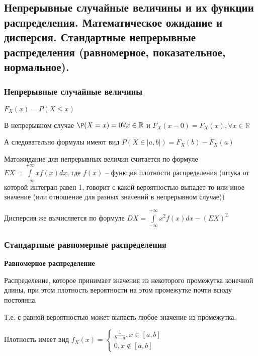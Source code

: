 \subsection{Непрерывные случайные величины и их функции распределения. Математическое ожидание и дисперсия. Стандартные непрерывные распределения (равномерное, показательное, нормальное).}

\subsubsection{Непрерывные случайные величины}


$F_X(x) = P(X \le x)$


В непрерывном случае $\P(X = x) = 0 \forall x \in \mathbb{R}$
и $F_X(x - 0) = F_X(x), \forall x \in \mathbb{R}$

А следовательно формулы имеют вид $P(X \in |a, b|) = F_X(b) - F_X(a)$



Матожидание для непрерывных величин считается по формуле $EX = \int\limits_{-\infty}^{+\infty}xf(x)dx$, где $f(x)$ -- функция плотности распределения (штука от которой интеграл равен 1, говорит с какой вероятностью выпадет то или иное значение (или отношение для разных значений в непрерывном случае))


Дисперсия же вычисляется по формуле $DX = \int\limits_{-\infty}^{+\infty} x^2 f(x) dx - (EX)^2$

\subsubsection{Стандартные равномерные распределения}

{\bf Равномерное распределение}

Распределение, которое принимает значения из некоторого промежутка конечной длины, при этом плотность вероятности на этом промежутке почти всюду постоянна.

Т.е. с равной вероятностью может выпасть любое значение из промежутка.

Плотность имеет вид $f_X(x) = \begin{cases}
	\frac{1}{b - a}, x \in [a, b]\\
	0, x \not\in [a, b]
\end{cases}$

